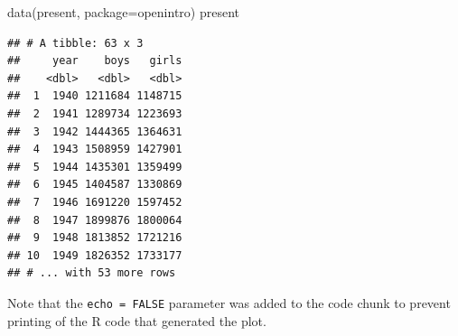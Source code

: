 \documentclass[
]{article}
\newenvironment{Shaded}{\begin{snugshade}}{\end{snugshade}}
\newcommand{\AttributeTok}[1]{\textcolor[rgb]{0.77,0.63,0.00}{#1}}
\newcommand{\FunctionTok}[1]{\textcolor[rgb]{0.00,0.00,0.00}{#1}}
\newcommand{\NormalTok}[1]{#1}
\newcommand{\StringTok}[1]{\textcolor[rgb]{0.31,0.60,0.02}{#1}}
\begin{document}
\begin{Shaded}
\begin{Highlighting}[]
\FunctionTok{data}\NormalTok{(}\StringTok{\textquotesingle{}present\textquotesingle{}}\NormalTok{, }\AttributeTok{package=}\StringTok{\textquotesingle{}openintro\textquotesingle{}}\NormalTok{)}
\NormalTok{present}
\end{Highlighting}
\end{Shaded}

\begin{verbatim}
## # A tibble: 63 x 3
##     year    boys   girls
##    <dbl>   <dbl>   <dbl>
##  1  1940 1211684 1148715
##  2  1941 1289734 1223693
##  3  1942 1444365 1364631
##  4  1943 1508959 1427901
##  5  1944 1435301 1359499
##  6  1945 1404587 1330869
##  7  1946 1691220 1597452
##  8  1947 1899876 1800064
##  9  1948 1813852 1721216
## 10  1949 1826352 1733177
## # ... with 53 more rows
\end{verbatim}

Note that the \texttt{echo\ =\ FALSE} parameter was added to the code
chunk to prevent printing of the R code that generated the plot.
\end{document}
